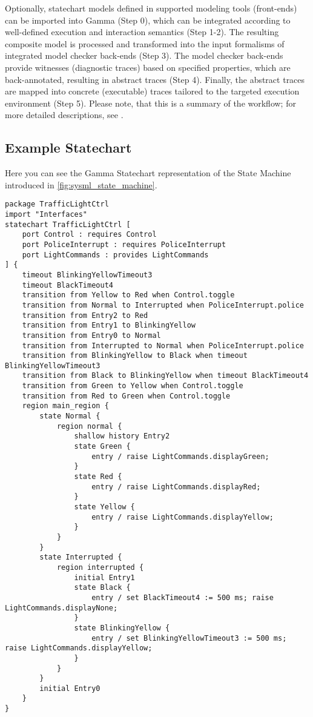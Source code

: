Optionally, statechart models defined in supported modeling tools (front-ends) can be imported into Gamma (Step 0), which can be integrated according to well-defined execution and interaction semantics (Step 1-2). The resulting composite model is processed and transformed into the input formalisms of integrated model checker back-ends (Step 3). The model checker back-ends provide witnesses (diagnostic traces) based on specified properties, which are back-annotated, resulting in abstract traces (Step 4).
Finally, the abstract traces are mapped into concrete (executable) traces tailored to the targeted execution environment (Step 5). Please note, that this is a summary of the workflow; for more detailed descriptions, see \cite{mixed_statecharts_2020}.

\subsection{Example Statechart}

Here you can see the Gamma Statechart representation of the State Machine introduced in \autoref{fig:sysml_state_machine}.

\begin{lstlisting}
package TrafficLightCtrl
import "Interfaces"
statechart TrafficLightCtrl [
	port Control : requires Control
	port PoliceInterrupt : requires PoliceInterrupt
	port LightCommands : provides LightCommands
] {
	timeout BlinkingYellowTimeout3
	timeout BlackTimeout4
	transition from Yellow to Red when Control.toggle
	transition from Normal to Interrupted when PoliceInterrupt.police
	transition from Entry2 to Red
	transition from Entry1 to BlinkingYellow
	transition from Entry0 to Normal
	transition from Interrupted to Normal when PoliceInterrupt.police
	transition from BlinkingYellow to Black when timeout BlinkingYellowTimeout3
	transition from Black to BlinkingYellow when timeout BlackTimeout4
	transition from Green to Yellow when Control.toggle
	transition from Red to Green when Control.toggle
	region main_region {
		state Normal {
			region normal {
				shallow history Entry2
				state Green {
					entry / raise LightCommands.displayGreen;
				}
				state Red {
					entry / raise LightCommands.displayRed;
				}
				state Yellow {
					entry / raise LightCommands.displayYellow;
				}
			}
		}
		state Interrupted {
			region interrupted {
				initial Entry1
				state Black {
					entry / set BlackTimeout4 := 500 ms; raise LightCommands.displayNone;
				}
				state BlinkingYellow {
					entry / set BlinkingYellowTimeout3 := 500 ms; raise LightCommands.displayYellow;
				}
			}
		}
		initial Entry0
	}
}
\end{lstlisting}